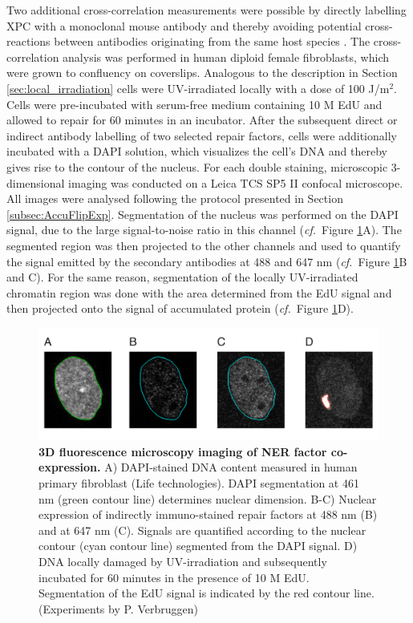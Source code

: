 Two additional cross-correlation measurements were possible by directly labelling XPC with a monoclonal mouse antibody and thereby avoiding potential cross-reactions between antibodies originating from the same host species \cite{Burry2011,Giepmans2006}. The cross-correlation analysis was performed in human diploid female fibroblasts, which were grown to confluency on coverslips. Analogous to the description in Section \ref{sec:local_irradiation} cells were UV-irradiated locally with a dose of 100 J/$\text{m}^\text{2}$. Cells were pre-incubated with serum-free medium containing 10 \textmu M EdU and allowed to repair for 60 minutes in an incubator. After the subsequent direct or indirect antibody labelling of two selected repair factors, cells were additionally incubated with a DAPI\label{sec:DAPI} solution, which visualizes the cell's DNA and thereby gives rise to the contour of the nucleus. For each double staining, microscopic 3-dimensional imaging was conducted on a Leica TCS SP5 II confocal microscope. All images were analysed following the protocol presented in Section \ref{subsec:AccuFlipExp}. Segmentation of the nucleus was performed on the DAPI signal, due to the large signal-to-noise ratio in this channel (\textit{cf.}\ Figure \ref{fig:coStaining}A). The segmented region was then projected to the other channels and used to quantify the signal emitted by the secondary antibodies at 488 and 647 nm (\textit{cf.}\ Figure \ref{fig:coStaining}B and C). For the same reason, segmentation of the locally UV-irradiated chromatin region was done with the area determined from the EdU signal and then projected onto the signal of accumulated protein (\textit{cf.}\ Figure \ref{fig:coStaining}D).   

\begin{figure}[t!]
	\begin{center}
		\includegraphics[width=1\textwidth]{Abbildungen/figure4_1.pdf}
		\caption{\textbf{3D fluorescence microscopy imaging of NER factor co-expression.} A) DAPI-stained DNA content measured in human primary fibroblast (Life technologies). DAPI segmentation at 461 nm  (green contour line) determines nuclear dimension. B-C) Nuclear expression of indirectly immuno-stained repair factors at 488 nm (B) and at 647 nm (C). Signals are quantified according to the nuclear contour (cyan contour line) segmented from the DAPI signal. D) DNA locally damaged by UV-irradiation and subsequently incubated for 60 minutes in the presence of 10 \textmu M EdU. Segmentation of the EdU signal is indicated by the red contour line.  (Experiments by P. Verbruggen)}
		\label{fig:coStaining}
	\end{center}
\end{figure}

